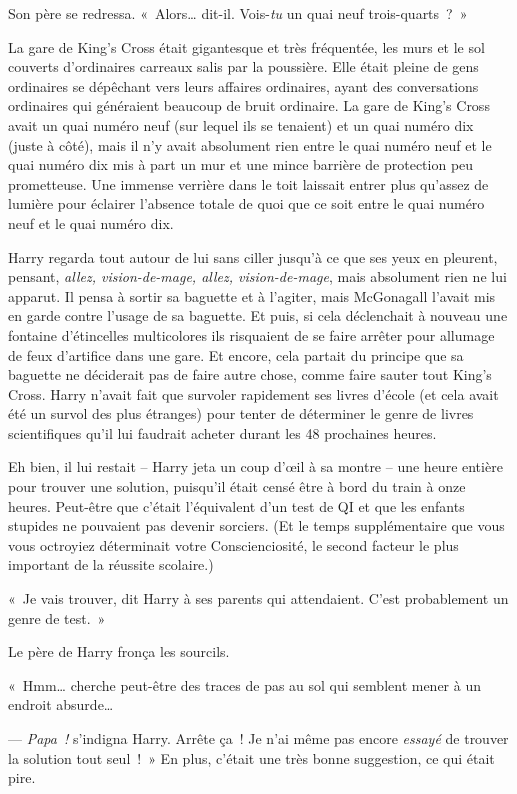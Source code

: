 Son père se redressa. «~Alors… dit-il. Vois-\emph{tu} un quai neuf trois-quarts~?~»

La gare de King's Cross était gigantesque et très fréquentée, les murs et le sol couverts d'ordinaires carreaux salis par la poussière.
Elle était pleine de gens ordinaires se dépêchant vers leurs affaires ordinaires, ayant des conversations ordinaires qui généraient beaucoup de bruit ordinaire.
La gare de King's Cross avait un quai numéro neuf (sur lequel ils se tenaient) et un quai numéro dix (juste à côté), mais il n'y avait absolument rien entre le quai numéro neuf et le quai numéro dix mis à part un mur et une mince barrière de protection peu prometteuse.
Une immense verrière dans le toit laissait entrer plus qu'assez de lumière pour éclairer l'absence totale de quoi que ce soit entre le quai numéro neuf et le quai numéro dix.

Harry regarda tout autour de lui sans ciller jusqu'à ce que ses yeux en pleurent, pensant, \emph{allez, vision-de-mage, allez, vision-de-mage}, mais absolument rien ne lui apparut.
Il pensa à sortir sa baguette et à l'agiter, mais McGonagall l'avait mis en garde contre l'usage de sa baguette.
Et puis, si cela déclenchait à nouveau une fontaine d'étincelles multicolores ils risquaient de se faire arrêter pour allumage de feux d'artifice dans une gare.
Et encore, cela partait du principe que sa baguette ne déciderait pas de faire autre chose, comme faire sauter tout King's Cross.
Harry n'avait fait que survoler rapidement ses livres d'école (et cela avait été un survol des plus étranges) pour tenter de déterminer le genre de livres scientifiques qu'il lui faudrait acheter durant les 48 prochaines heures.

Eh bien, il lui restait -- Harry jeta un coup d'œil à sa montre -- une heure entière pour trouver une solution, puisqu'il était censé être à bord du train à onze heures.
Peut-être que c'était l'équivalent d'un test de QI et que les enfants stupides ne pouvaient pas devenir sorciers.
(Et le temps supplémentaire que vous vous octroyiez déterminait votre Conscienciosité, le second facteur le plus important de la réussite scolaire.)

«~Je vais trouver, dit Harry à ses parents qui attendaient. C'est probablement un genre de test.~»

Le père de Harry fronça les sourcils.

«~Hmm… cherche peut-être des traces de pas au sol qui semblent mener à un endroit absurde…

--- \emph{Papa~!} s'indigna Harry. Arrête ça~! Je n'ai même pas encore \emph{essayé} de trouver la solution tout seul~!~» En plus, c'était une très bonne suggestion, ce qui était pire.


